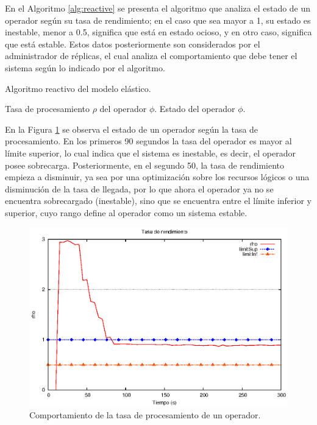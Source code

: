 En el Algoritmo \ref{alg:reactive} se presenta el algoritmo que analiza el estado de un operador según su tasa de rendimiento; en el caso que sea mayor a 1, su estado es inestable, menor a 0.5, significa que está en estado ocioso, y en otro caso, significa que está estable. Estos datos posteriormente son considerados por el administrador de réplicas, el cual analiza el comportamiento que debe tener el sistema según lo indicado por el algoritmo.

\begin{algorithm}[!ht]
	\caption{Algoritmo reactivo del modelo elástico.}
	\label{alg:reactive}
	\begin{algorithmic}[1]
	\REQUIRE Tasa de procesamiento $\rho$ del operador $\phi$.
	\ENSURE Estado del operador $\phi$.
	\end{algorithmic}
\end{algorithm}

En la Figura \ref{fig:umbrales} se observa el estado de un operador según la tasa de procesamiento. En los primeros 90 segundos la tasa del operador es mayor al límite superior, lo cual indica que el sistema es inestable, es decir, el operador posee sobrecarga. Posteriormente, en el segundo 50, la tasa de rendimiento empieza a disminuir, ya sea por una optimización sobre los recursos lógicos o una disminución de la tasa de llegada, por lo que ahora el operador ya no se encuentra sobrecargado (inestable), sino que se encuentra entre el límite inferior y superior, cuyo rango define al operador como un sistema estable.

\begin{figure}[ht!]
  \centering
    \includegraphics[scale=0.8]{images/Umbrales.eps}
  \caption{Comportamiento de la tasa de procesamiento de un operador.}
  \label{fig:umbrales}
\end{figure}


